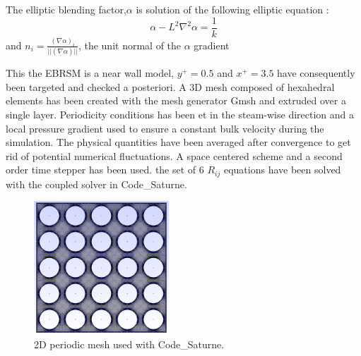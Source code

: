 \documentclass[11pt,letterpaper,english]{article}
\begin{document}
The elliptic blending factor,$\alpha$ is solution of the following elliptic equation :
\begin{equation}
  \alpha - L^{2} \nabla^{2} \alpha = \frac{1}{k} 
\end{equation}
and $n_{i} = \frac{(\nabla \alpha)_{i}}{||(\underline{\nabla} \alpha)||}$, the unit normal of the $\alpha$ gradient

This the EBRSM is a near wall model, $y^{+} = 0.5$ and $x^{+} = 3.5$ have consequently been targeted and checked a posteriori. A 3D mesh composed of hexahedral elements has been created with the mesh generator Gmsh and extruded over a single layer. Periodicity conditions has been et in the steam-wise direction and a local pressure gradient used to ensure a constant bulk velocity during the simulation. The physical quantities have been averaged after convergence to get rid of potential numerical fluctuations.
A space centered scheme and a second order time stepper has been used. the set of 6 $R_{ij}$ equations have been solved with the coupled solver in Code\_Saturne.

\begin{figure}
  \begin{center}
    \includegraphics[height = 50mm]{./Figures/ss_thimble/ss_thimble_mesh.png}
    \caption{2D periodic mesh used with Code\_Saturne.}
  \end{center}
\end{figure}
\end{document}
